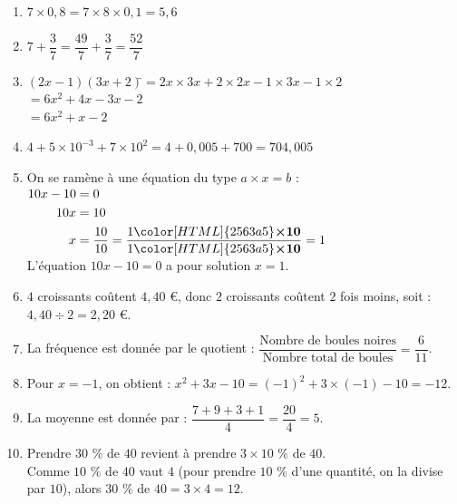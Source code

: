 \documentclass[a4paper,11pt,exos]{nsi} %
\begin{document}
\textcolor{UGLiBlue}{
\begin{enumerate}[itemsep=1em]
    \item $7 \times 0{,}8=7\times 8\times 0,1=5{,}6$
    \item $7+\dfrac{3}{7}= \dfrac{49}{7}+\dfrac{3}{7}=\dfrac{52}{7}$
    \item \begin{tabbing}
        $(2x-1)(3x+2)$\=$=2x\times 3x+2\times 2x-1\times 3x-1\times 2$\\
        \>$=6x^2+4x-3x-2$\\
        \>$=6x^2+x-2$
    \end{tabbing}
    \item $4+5\times 10^{-3}+7\times10^2=4+0{,}005+700=704{,}005$
    \item On se ramène à une équation du type $a\times x=b$ :\\
              $\begin{aligned}
              10x-10&=0\\
             10x&=10\\
                                  x&=\dfrac{10}{10}=\dfrac{1{\color[HTML]{2563a5}\boldsymbol{\times10}} }{1{\color[HTML]{2563a5}\boldsymbol{\times10}}}=1
             \end{aligned}$\\
              L'équation $10x-10=0$ a pour solution $x=1$.
    \item $4$ croissants coûtent  $4{,}40$ €, donc
                           $2$ croissants coûtent $2$ fois moins, soit : \\
                           $4{,}40\div 2=2{,}20$ €.
    \item La fréquence est donnée par le quotient : $\dfrac{\text{Nombre de boules noires}}{\text{Nombre total de boules}}=\dfrac{6}{11}$.
    \item 
                Pour $x=-1$, on obtient : $x^2+3x-10=(-1)^2+3\times (-1)-10=-12$.
    \item La moyenne est donnée par : $\dfrac{7+9+3+1}{4}=\dfrac{20}{4}=5$.
    \item           Prendre $30$ $\%$  de $40$ revient à prendre $3\times 10$ $\%$  de $40$.\\
                Comme $10$ $\%$  de $40$ vaut $4$ (pour prendre $10$ $\%$  d'une quantité, on la divise par $10$), alors
                $30$ $\%$ de $40=3\times 4=12$.
\end{enumerate}}
\end{document}

